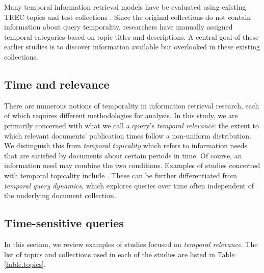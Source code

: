 \documentclass{sig-alternate}
\begin{document}
Many temporal information retrieval models have be evaluated using existing TREC topics and test collections \cite{Li2003, Jones2007, Efron2011, Dakka2012, Peetz2013a}. Since the original collections do not contain information about query temporality, researchers have manually assigned temporal categories  based on topic titles and descriptions.  A central goal of these earlier studies is to discover information available but overlooked in these existing collections.


\subsection{Time and relevance}

There are numerous notions of temporality in information retrieval research, each of which requires different methodologies for analysis. In this study, we are primarily concerned with what we call a query's \emph{temporal relevance}: the extent to which relevant documents' publication times follow a non-uniform distribution. We distinguish this from \emph{temporal topicality} which refers to information needs that are satisfied by documents about certain periods in time. Of course, an information need may combine the two conditions. Examples of studies concerned with temporal topicality include \cite{Berberich2010,Kanhabua2011}. These can be further differentiated from \emph{temporal query dynamics}, which explores  queries over time \cite{Shokouhi2011,Kulkarni2011} often independent of the underlying document collection.

\subsection{Time-sensitive queries}

In this section, we review examples of studies focused on \emph{temporal relevance}.  The list of topics and collections used in each of the studies are listed in Table \ref{table.topics}. 
\end{document}
